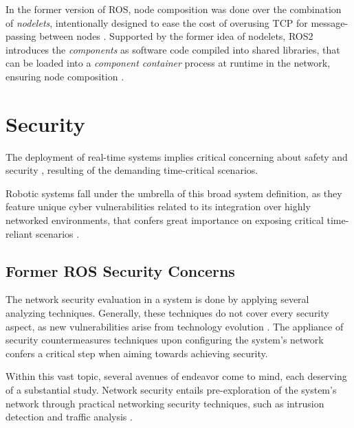 In the former version of ROS, node composition was done over the combination of \textit{nodelets}, intentionally designed to ease the cost of overusing TCP for message-passing between nodes \cite{ros-nodelets}.  Supported by the former idea of nodelets, ROS2 introduces the \textit{components} as software code compiled into shared libraries, that can be loaded into a \textit{component container} process at runtime in the network, ensuring node composition \cite{ros2documentation}. 

           

\section{Security}

The deployment of real-time systems implies critical concerning about safety and security \cite{maruyama2016exploring}, resulting of the demanding time-critical scenarios. 

Robotic systems fall under the umbrella of this broad system definition, as they feature unique cyber vulnerabilities related to its integration over highly networked environments, that confers great importance on exposing critical time-reliant scenarios \cite{mcclean2013preliminary, dieber2017security}.

\subsection{Former ROS Security Concerns}

The network security evaluation in a system is done by applying several analyzing techniques. Generally, these techniques do not cover every security aspect, as new vulnerabilities arise from technology evolution \cite{kaeo2004designing}.
The appliance of security countermeasures techniques upon configuring the system's network confers a critical step when aiming towards achieving security.

Within this vast topic, several avenues of endeavor come to mind, each deserving of a substantial study. Network security entails pre-exploration of the system's network through practical networking security techniques, such as intrusion detection and traffic analysis \cite{marin2005network}.

